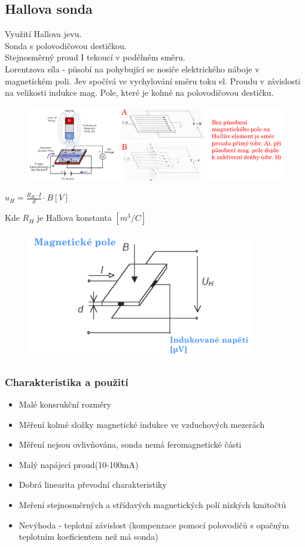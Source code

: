 \subsection{Hallova sonda}
Využití Hallova jevu.\\
Sonda s polovodičovou destičkou.\\
Stejnosměrný proud I tekoucí v podélném směru.\\
Lorentzova síla - působí na pohybující se nosiče elektrického náboje v magnetickém poli. Jev spočívá ve vychylování směru toku el. Proudu v závislosti na velikosti indukce mag. Pole, které je kolmé na polovodičovou destičku.\\
\begin{figure}[h!]
    \centering
    \includegraphics[scale = 0.5]{images/MVEHall1.png}
\end{figure}
\begin{center}
    \(u_H = \frac{R_H\cdot I}{d}\cdot B [V]\)
\end{center}
Kde \(R_H\) je Hallova konstanta \([m^3/C]\)

\begin{figure}[h!]
    \centering
    \includegraphics[scale = 0.5]{images/MVEHall3.png}
\end{figure}

\subsubsection{Charakteristika a použití}
\begin{itemize}
    \item Malé konsrukční rozměry
    \item Měření kolmé složky magnetické indukce ve vzduchových mezerách
    \item Měření nejsou ovlivňována, sonda nemá feromagnetické části
    \item Malý napájecí proud(10-100mA)
    \item Dobrá linearita převodní charakteristiky
    \item Meření stejnosměrných a střídavých magnetických polí nízkých kmitočtů
    \item Nevýhoda - teplotní závislost (kompenzace pomocí polovodičů s opačným teplotním koeficientem než má sonda)
\end{itemize}

